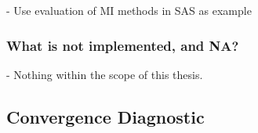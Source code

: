 \documentclass[article]{jss}
\begin{document}
- Use evaluation of MI methods in SAS as example


\subsubsection{What is not implemented, and NA?}

- Nothing within the scope of this thesis.

\subsection{Convergence Diagnostic} \label{sec:convergence}

\end{document}
